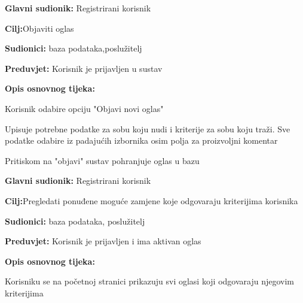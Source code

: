 \noindent {}
\begin{packed_item}

	\item \textbf{Glavni sudionik: }Registrirani korisnik
	\item  \textbf{Cilj:}Objaviti oglas
	\item  \textbf{Sudionici:} baza podataka,poslužitelj
	\item  \textbf{Preduvjet:} Korisnik je prijavljen u sustav
	\item  \textbf{Opis osnovnog tijeka:}

	\item[] \begin{packed_enum}

				\item Korisnik odabire opciju "Objavi novi oglas"
				\item Upisuje potrebne podatke za sobu koju nudi i kriterije za sobu koju traži. Sve podatke odabire iz padajućih izbornika osim polja za proizvoljni komentar
				\item Pritiskom na "objavi" sustav pohranjuje oglas u bazu
	\end{packed_enum}

\end{packed_item}

\noindent {}
\begin{packed_item}

	\item \textbf{Glavni sudionik: }Registrirani korisnik
	\item  \textbf{Cilj:}Pregledati ponuđene moguće zamjene koje odgovaraju kriterijima korisnika
	\item  \textbf{Sudionici:} baza podataka, poslužitelj
	\item  \textbf{Preduvjet:} Korisnik je prijavljen i ima aktivan oglas
	\item  \textbf{Opis osnovnog tijeka:}

	\item[] \begin{packed_enum}

				\item Korisniku se na početnoj stranici prikazuju svi oglasi koji odgovaraju njegovim kriterijima

	\end{packed_enum}
\end{packed_item}

